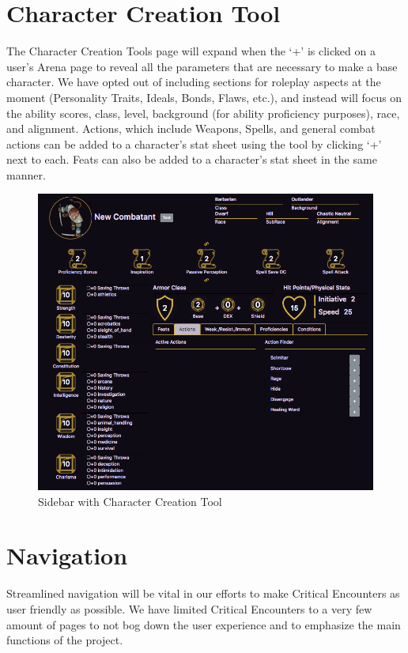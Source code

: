 \documentclass[12pt,a4paper]{report}
\begin{document}
	\section{Character Creation Tool}
	The Character Creation Tools page will expand when the `+' is clicked on a user's Arena page to reveal all the parameters that are necessary to make a base character. We have opted out of including sections for roleplay aspects at the moment (Personality Traits, Ideals, Bonds, Flaws, etc.), and instead will focus on the ability scores, class, level, background (for ability proficiency purposes), race, and alignment. Actions, which include Weapons, Spells, and general combat actions can be added to a character's stat sheet using the tool by clicking `+' next to each. Feats can also be added to a character's stat sheet in the same manner.
	\begin{figure}[H]
		\centering
		\includegraphics[scale=.55]{charactercreationtool}
		\caption{Sidebar with Character Creation Tool}
		\label {fig: Character Creation Tool}
	\end{figure}
	\newpage	
	\section{Navigation}
	Streamlined navigation will be vital in our efforts to make Critical Encounters as user friendly as possible. We have limited Critical Encounters to a very few amount of pages to not bog down the user experience and to emphasize the main functions of the project.
\end{document}
